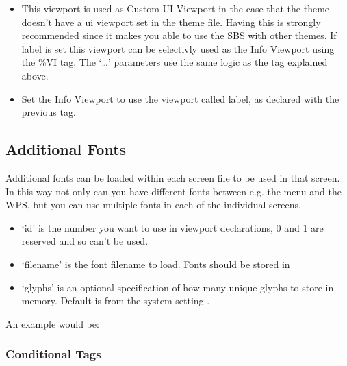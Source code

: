 {  \begin{itemize}
    \item {}
    This viewport is used as Custom UI Viewport in the case that the theme
    doesn't have a ui viewport set in the theme  file. Having this
    is strongly recommended since it makes you able to use the SBS
    with other themes. If label is set this viewport can be selectivly used as the
    Info Viewport using the \%VI tag. The `\dots' parameters use the same logic as
    the  tag explained above.

    \item {} Set the Info Viewport to use the viewport called
    label, as declared with the previous tag.
  \end{itemize}

\subsection{\label{ref:multifont}Additional Fonts}
Additional fonts can be loaded within each screen file to be used in that
screen. In this way not only can you have different fonts between e.g. the menu
and the WPS, but you can use multiple fonts in each of the individual screens.\\


  \begin{itemize}
    \item `id' is the number you want to use in viewport declarations, 0 and 1
       are reserved and so can't be used.
    \item `filename' is the font filename to load. Fonts should be stored in
    \item `glyphs' is an optional specification of how many unique glyphs to
       store in memory. Default is from the system setting
       .
  \end{itemize}

  An example would be: 

}

\subsubsection{Conditional Tags}

